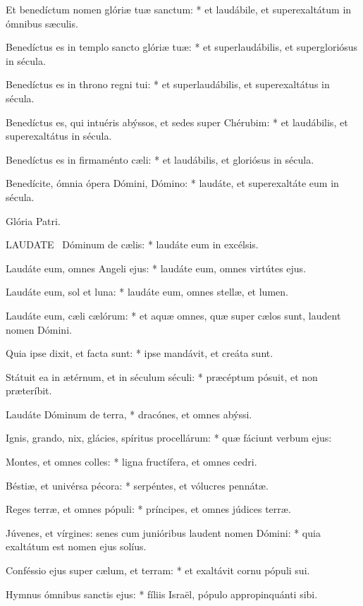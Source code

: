 Et benedíctum nomen glóriæ tuæ sanctum: * et laudábile, et superexaltátum in ómnibus sæculis.

Benedíctus es in templo sancto glóriæ tuæ: * et superlaudábilis, et supergloriósus in sécula.

Benedíctus es in throno regni tui: * et superlaudábilis, et superexaltátus in sécula.

Benedíctus es, qui intuéris abýssos, et sedes super Chérubim: * et laudábilis, et superexaltátus in sécula.

Benedíctus es in firmaménto cæli: * et laudábilis, et gloriósus in sécula.

Benedícite, ómnia ópera Dómini, Dómino: * laudáte, et superexaltáte eum in sécula.

Glória Patri.


\lettrine[lines=2]{L}{AUDATE} \textdagger\ Dóminum de cælis: * laudáte eum in excélsis.

Laudáte eum, omnes Angeli ejus: * laudáte eum, omnes virtútes ejus.

Laudáte eum, sol et luna: * laudáte eum, omnes stellæ, et lumen.

Laudáte eum, cæli cælórum: * et aquæ omnes, quæ super cælos sunt, laudent nomen Dómini.

Quia ipse dixit, et facta sunt: * ipse mandávit, et creáta sunt.

Státuit ea in ætérnum, et in séculum séculi: * præcéptum pósuit, et non præteríbit.

Laudáte Dóminum de terra, * dracónes, et omnes abýssi.

Ignis, grando, nix, glácies, spíritus procellárum: * quæ fáciunt verbum ejus:

Montes, et omnes colles: * ligna fructífera, et omnes cedri.

Béstiæ, et univérsa pécora: * serpéntes, et vólucres pennátæ.

Reges terræ, et omnes pópuli: * príncipes, et omnes júdices terræ.

Júvenes, et vírgines: senes cum junióribus laudent nomen Dómini: * quia exaltátum est nomen ejus solíus.

Conféssio ejus super cælum, et terram: * et exaltávit cornu pópuli sui.

Hymnus ómnibus sanctis ejus: * fíliis Israël, pópulo appropinquánti sibi.


